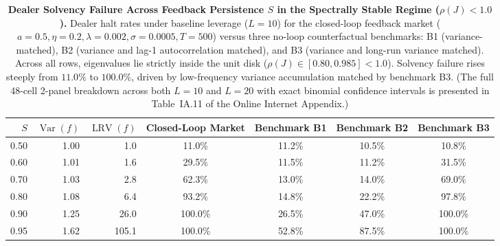 \documentclass[12pt]{article}
\theoremstyle{definition}
\theoremstyle{remark}
\begin{document}
\begin{table}[htbp]
\centering\footnotesize
\setlength{\tabcolsep}{6pt}
\caption{\textbf{Dealer Solvency Failure Across Feedback Persistence $S$ in the Spectrally Stable Regime ($\rho(J) < 1.0$).}
Dealer halt rates under baseline leverage ($L=10$) for the closed-loop feedback market ($a=0.5, \eta=0.2, \lambda=0.002, \sigma=0.0005, T=500$) versus three no-loop counterfactual benchmarks: B1 (variance-matched), B2 (variance and lag-1 autocorrelation matched), and B3 (variance and long-run variance matched). Across all rows, eigenvalues lie strictly inside the unit disk ($\rho(J) \in [0.80, 0.985] < 1.0$). Solvency failure rises steeply from $11.0\%$ to $100.0\%$, driven by low-frequency variance accumulation matched by benchmark B3. (The full 48-cell 2-panel breakdown across both $L=10$ and $L=20$ with exact binomial confidence intervals is presented in Table~IA.11 of the Online Internet Appendix.)}
\label{tab:dealer_drawdown_stats}
\begin{tabular}{rrrcccc}\toprule
$S$ & $\operatorname{Var}(f)$ & $\operatorname{LRV}(f)$ & Closed-Loop Market & Benchmark B1 & Benchmark B2 & Benchmark B3 \\\midrule
0.50 & 1.00 & 1.0 & 11.0\% & 11.2\% & 10.5\% & 10.8\% \\
0.60 & 1.01 & 1.6 & 29.5\% & 11.5\% & 11.2\% & 31.5\% \\
0.70 & 1.03 & 2.8 & 62.3\% & 13.0\% & 14.0\% & 69.0\% \\
0.80 & 1.08 & 6.4 & 93.2\% & 14.8\% & 22.2\% & 97.8\% \\
0.90 & 1.25 & 26.0 & 100.0\% & 26.5\% & 47.0\% & 100.0\% \\
0.95 & 1.62 & 105.1 & 100.0\% & 52.8\% & 87.5\% & 100.0\% \\\bottomrule
\end{tabular}
\end{table}
\end{document}
